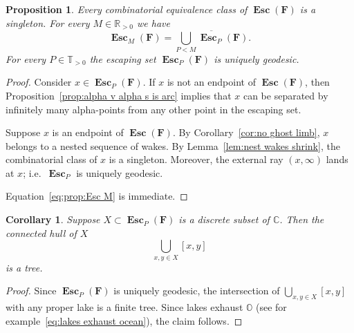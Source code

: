 \documentclass{amsart}
\newcommand{\1}{{\mathbb 1 }}
\newcommand\binfty{{\infty}}%
\newcommand\PT{\mathbb{ T}}
\newcommand{\bO}{{\mathbb{O}}}
\newcommand{\bF}{{\mathbf F}}
\newcommand{\C}{\mathbb{C}}
\newcommand{\R}{\mathbb{R}}
\newtheorem{cor}[thm]{Corollary}
\newtheorem{prop}[thm]{Proposition}
\theoremstyle{remark}
\numberwithin{equation}{section}
\theoremstyle{definition}
\newcommand{\Esc}{{\boldsymbol{\operatorname{Esc}}}}
\theoremstyle{nonumberbreak}
\begin{document}
\begin{prop}
\label{prop:Esc M}
Every combinatorial equivalence class of $\Esc(\bF)$ is a singleton. For every $M\in \R_{>0}$ we have
\begin{equation}
\label{eq:prop:Esc M}
\Esc_M(\bF)=\overline{\bigcup_{P<M} \Esc_P(\bF)}.
\end{equation}
For every $P\in \PT_{>0}$ the escaping set $\Esc_P(\bF)$ is uniquely geodesic. 
\end{prop}
\begin{proof}
Consider $x\in \Esc_P(\bF)$. If $x$ is not an endpoint of $\Esc(\bF)$, then Proposition~\ref{prop:alpha v alpha s is arc}  implies that $x$ can be separated by infinitely many alpha-points from any other point in the escaping set.

 Suppose $x$ is an endpoint of $\Esc(\bF)$. By Corollary~\ref{cor:no ghost limb}, $x$ belongs to a nested sequence of wakes. By Lemma~\ref{lem:nest wakes shrink}, the combinatorial class of $x$ is a singleton. Moreover, the external ray $(x,\binfty)$ lands at $x$; i.e.~$\Esc_P$ is uniquely geodesic. 
 
 Equation~\eqref{eq:prop:Esc M} is immediate. 
\end{proof}




\begin{cor}
\label{cor:Esc is Tree}
Suppose $X\subset \Esc_P(\bF)$ is a discrete subset of $\C$. Then the \emph{connected hull} of $X$
\[\bigcup_{x,y\in X} [x,y]\]
is a tree.
\end{cor}
\begin{proof}
Since $\Esc_P(\bF)$ is uniquely geodesic, the intersection of $\displaystyle\bigcup_{x,y\in X} [x,y]$ with any proper lake is a finite tree. Since lakes exhaust $\bO$ (see  for example~\eqref{eq:lakes exhaust ocean}), the claim follows. 
\end{proof}
\end{document}
